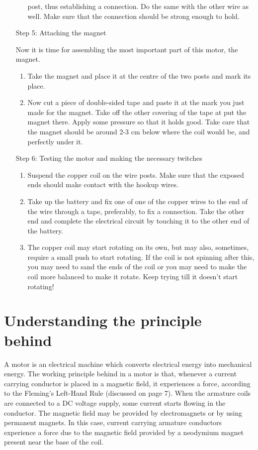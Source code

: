 \begin{enumerate}
\begin{enumerate}
            post, thus establishing a connection. Do the same with the other
            wire as well. Make sure that the connection should be strong
            enough to hold.            
        \end{enumerate}
    \item[Step 5:] Attaching the magnet
        \item[] Now it is time for assembling the most important part of this motor, the
            magnet.
        \begin{enumerate}
            \item Take the magnet and place it at the centre of the two posts and
            mark its place.
            \item Now cut a piece of double-sided tape and paste it at the mark
            you just made for the magnet. Take off the other covering of the
            tape at put the magnet there. Apply some pressure so that it holds
            good. Take care that the magnet should be around 2-3 cm below
            where the coil would be, and perfectly under it.        
        \end{enumerate}
    \item[Step 6:] Testing the motor and making the necessary twitches
        \begin{enumerate}
            \item Suspend the copper coil on the wire posts. Make sure that the
            exposed ends should make contact with the hookup wires.
            \item Take up the battery and fix one of one of the copper wires to the
            end of the wire through a tape, preferably, to fix a connection.
            Take the other end and complete the electrical circuit by touching
            it to the other end of the battery.
            \item The copper coil may start rotating on its own, but may also,
            sometimes, require a small push to start rotating. If the coil is not
            spinning after this, you may need to sand the ends of the coil or
            you may need to make the coil more balanced to make it rotate.
            Keep trying till it doesn’t start rotating!
        \end{enumerate} 
\end{enumerate}

\section{Understanding the principle behind}
A motor is an electrical machine which converts electrical energy into mechanical energy. The working principle behind in a motor is that, whenever
a current carrying conductor is placed in a magnetic field, it experiences
a force, according to the Fleming’s Left-Hand Rule (discussed on page 7).
When the armature coils are connected to a DC voltage supply, some current
starts flowing in the conductor. The magnetic field may be provided by electromagnets or by using permanent magnets. In this case, current carrying
armature conductors experience a force due to the magnetic field provided by
a neodymium magnet present near the base of the coil.